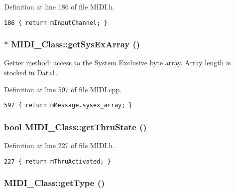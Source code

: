Definition at line 186 of file MIDI.h.

\begin{Code}\begin{verbatim}186 { return mInputChannel; }
\end{verbatim}
\end{Code}


\hypertarget{class_m_i_d_i___class_4540dd7720884677b50cff2f23d1982a}{
\subsubsection[{getSysExArray}]{ $\ast$ MIDI\_\-Class::getSysExArray ()}}
\label{class_m_i_d_i___class_4540dd7720884677b50cff2f23d1982a}


Getter method: access to the System Exclusive byte array. Array length is stocked in Data1. 

Definition at line 597 of file MIDI.cpp.

\begin{Code}\begin{verbatim}597 { return mMessage.sysex_array; }
\end{verbatim}
\end{Code}


\hypertarget{class_m_i_d_i___class_76c71d380b9221207062aa669a9c0005}{
\subsubsection[{getThruState}]{\setlength{\rightskip}{0pt plus 5cm}bool MIDI\_\-Class::getThruState ()}}
\label{class_m_i_d_i___class_76c71d380b9221207062aa669a9c0005}




Definition at line 227 of file MIDI.h.

\begin{Code}\begin{verbatim}227 { return mThruActivated; }
\end{verbatim}
\end{Code}


\hypertarget{class_m_i_d_i___class_b43d8c2b277cf2408865b4f63111080b}{
\subsubsection[{getType}]{ MIDI\_\-Class::getType ()}}
\label{class_m_i_d_i___class_b43d8c2b277cf2408865b4f63111080b}


